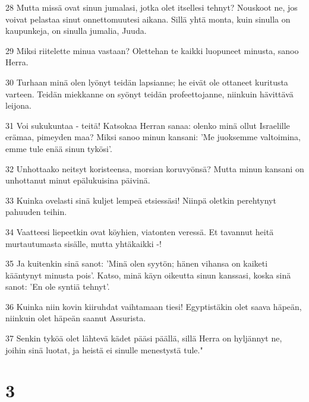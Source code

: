 \par 28 Mutta missä ovat sinun jumalasi, jotka olet itsellesi tehnyt? Nouskoot ne, jos voivat pelastaa sinut onnettomuutesi aikana. Sillä yhtä monta, kuin sinulla on kaupunkeja, on sinulla jumalia, Juuda.
\par 29 Miksi riitelette minua vastaan? Olettehan te kaikki luopuneet minusta, sanoo Herra.
\par 30 Turhaan minä olen lyönyt teidän lapsianne; he eivät ole ottaneet kuritusta varteen. Teidän miekkanne on syönyt teidän profeettojanne, niinkuin hävittävä leijona.
\par 31 Voi sukukuntaa - teitä! Katsokaa Herran sanaa: olenko minä ollut Israelille erämaa, pimeyden maa? Miksi sanoo minun kansani: 'Me juoksemme valtoimina, emme tule enää sinun tykösi'.
\par 32 Unhottaako neitsyt koristeensa, morsian koruvyönsä? Mutta minun kansani on unhottanut minut epälukuisina päivinä.
\par 33 Kuinka ovelasti sinä kuljet lempeä etsiessäsi! Niinpä oletkin perehtynyt pahuuden teihin.
\par 34 Vaatteesi liepeetkin ovat köyhien, viatonten veressä. Et tavannut heitä murtautumasta sisälle, mutta yhtäkaikki -!
\par 35 Ja kuitenkin sinä sanot: 'Minä olen syytön; hänen vihansa on kaiketi kääntynyt minusta pois'. Katso, minä käyn oikeutta sinun kanssasi, koska sinä sanot: 'En ole syntiä tehnyt'.
\par 36 Kuinka niin kovin kiiruhdat vaihtamaan tiesi! Egyptistäkin olet saava häpeän, niinkuin olet häpeän saanut Assurista.
\par 37 Senkin tyköä olet lähtevä kädet pääsi päällä, sillä Herra on hyljännyt ne, joihin sinä luotat, ja heistä ei sinulle menestystä tule."

\chapter{3}

